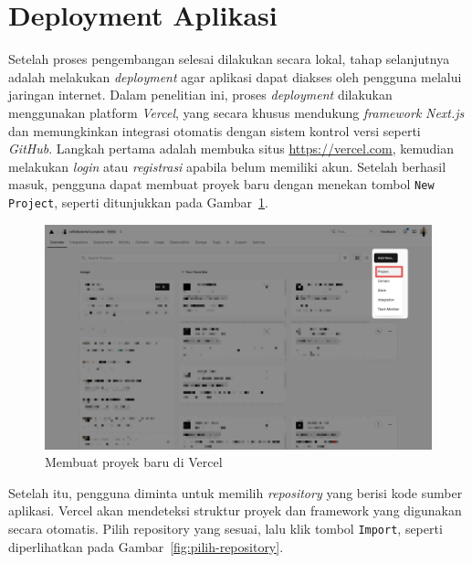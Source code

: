 \section{Deployment Aplikasi}

Setelah proses pengembangan selesai dilakukan secara lokal, tahap selanjutnya adalah melakukan \textit{deployment} agar aplikasi dapat diakses oleh pengguna melalui jaringan internet. Dalam penelitian ini, proses \textit{deployment} dilakukan menggunakan platform \textit{Vercel}, yang secara khusus mendukung \textit{framework} \textit{Next.js} dan memungkinkan integrasi otomatis dengan sistem kontrol versi seperti \textit{GitHub}.
\singlespacing{}
Langkah pertama adalah membuka situs \url{https://vercel.com}, kemudian melakukan \textit{login} atau \textit{registrasi} apabila belum memiliki akun. Setelah berhasil masuk, pengguna dapat membuat proyek baru dengan menekan tombol \texttt{New Project}, seperti ditunjukkan pada Gambar~\ref{fig:buat-project}.

\begin{figure}[H]
  \centering
  \includegraphics[width=0.85\linewidth]{images/bab-3/deploy-1.png}
  \caption{Membuat proyek baru di Vercel}\label{fig:buat-project}
\end{figure}

Setelah itu, pengguna diminta untuk memilih \textit{repository} yang berisi kode sumber aplikasi. Vercel akan mendeteksi struktur proyek dan framework yang digunakan secara otomatis. Pilih repository yang sesuai, lalu klik tombol \texttt{Import}, seperti diperlihatkan pada Gambar~\ref{fig:pilih-repository}.

